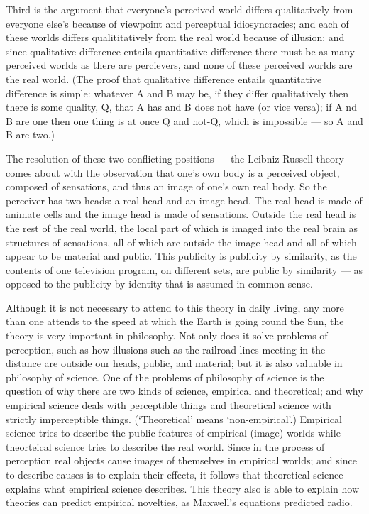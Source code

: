 \documentclass[11pt]{article}
\begin{document}
Third is the argument that everyone's perceived world differs qualitatively from everyone else's because of viewpoint and perceptual idiosyncracies; and each of these worlds differs qualititatively from the real world because of illusion; and since qualitative difference entails quantitative difference there must be as many perceived worlds as there are percievers, and none of these perceived worlds are the real world. (The proof that qualitative difference entails quantitative difference is simple: whatever A and B may be, if they differ qualitatively then there is some quality, Q, that A has and B does not have (or vice versa); if A nd B are one then one thing is at once Q and not-Q, which is impossible --- so A and B are two.)

The resolution of these two conflicting positions --- the Leibniz-Russell theory --- comes about with the observation that one's own body is a perceived object, composed of sensations, and thus an image of one's own real body. So the perceiver has two heads: a real head and an image head. The real head is made of animate cells and the image head is made of sensations. Outside the real head is the rest of the real world, the local part of which is imaged into the real brain as structures of sensations, all of which are outside the image head and all of which appear to be material and public. This publicity is publicity by similarity, as the contents of one television program, on different sets, are public by similarity --- as opposed to the publicity by identity that is assumed in common sense.

Although it is not necessary to attend to this theory in daily living, any more than one attends to the speed at which the Earth is going round the Sun, the theory is very important in philosophy. Not only does it solve problems of perception, such as how illusions such as the railroad lines meeting in the distance are outside our heads, public, and material; but it is also valuable in philosophy of science. One of the problems of philosophy of science is the question of why there are two kinds of science, empirical and theoretical; and why empirical science deals with perceptible things and theoretical science with strictly imperceptible things. (`Theoretical' means `non-empirical'.) Empirical science tries to describe the public features of empirical (image) worlds while theorteical science tries to describe the real world. Since in the process of perception real objects cause images of themselves in empirical worlds; and since to describe causes is to explain their effects, it follows that theoretical science explains what empirical science describes. This theory also is able to explain how theories can predict empirical novelties, as Maxwell's equations predicted radio.
\end{document}
